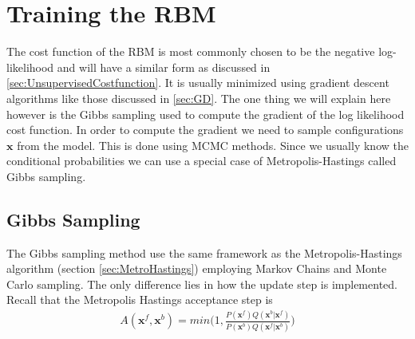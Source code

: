\begin{comment}
\subsubsection{Further analysis of the GB-RBM - the marginal prob as a MoG}

\subsection{Gaussian-something continuous RBM?}
If we use Gaussian latent variables and Gaussian visible variables, we get an undirected version of factor analysis. However, it turns out that it is identical to the standard directed version (Marks and Movellan 2001).
If we use Gaussian latent variables and categorical observed variables, we get an undirected version of categorical PCA (Section 27.2.2). In (Salakhutdinov et al. 2007), this was applied to the Netflix collaborative filtering problem, but was found to be significantly inferior to using binary latent variables, which have more expressive power. \cite{Murphy2012}
\end{comment}




\section{Training the RBM}

The cost function of the RBM is most commonly chosen to be the negative log-likelihood and will have a similar form as discussed in \ref{sec:UnsupervisedCostfunction}. It is usually minimized using gradient descent algorithms like those discussed in \ref{sec:GD}. The one thing we will explain here however is the Gibbs sampling used to compute the gradient of the log likelihood cost function. In order to compute the gradient we need to sample configurations $\bm{x}$ from the model. This is done using MCMC methods. Since we usually know the conditional probabilities we can use a special case of Metropolis-Hastings called Gibbs sampling.

\subsection{Gibbs Sampling}
The Gibbs sampling method use the same framework as the Metropolis-Hastings algorithm (section \ref{sec:MetroHastings}) employing Markov Chains and Monte Carlo sampling. The only difference lies in how the update step is implemented. 
Recall that the Metropolis Hastings acceptance step is
\begin{align}
	A(\bm{x}^f, \bm{x}^b) = min \Big(1,  \frac{  P(\bm{x}^f) Q(\bm{x}^b| \bm{x}^f) }
	{  P(\bm{x}^b) Q(\bm{x}^f| \bm{x}^b)  }  \Big)
\end{align}

